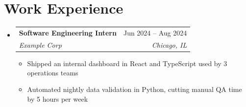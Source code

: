\documentclass[letterpaper,11pt]{article}
\makeatletter
\newcommand{\resumeItem}[1]{
  \item\small{
    {#1 \vspace{-2pt}}
  }
}
\newcommand{\resumeSubheading}[4]{
  \vspace{-2pt}\item
    \begin{tabular*}{0.97\textwidth}[t]{l@{\extracolsep{\fill}}r}
      \textbf{#1} & #2 \\
      \textit{\small#3} & \textit{\small #4} \\
    \end{tabular*}\vspace{-7pt}
}
\newcommand{\resumeSubHeadingListStart}{\begin{itemize}[leftmargin=0.15in, label={}]}
\newcommand{\resumeSubHeadingListEnd}{\end{itemize}}
\newcommand{\resumeItemListStart}{\begin{itemize}}
\newcommand{\resumeItemListEnd}{\end{itemize}\vspace{-5pt}}
\makeatother
\begin{document}
\section{Work Experience}
  \resumeSubHeadingListStart
    \resumeSubheading
      {Software Engineering Intern}{Jun 2024 -- Aug 2024}
      {Example Corp}{Chicago, IL}
      \resumeItemListStart
        \resumeItem{Shipped an internal dashboard in React and TypeScript used by 3 operations teams}
        \resumeItem{Automated nightly data validation in Python, cutting manual QA time by 5 hours per week}
      \resumeItemListEnd
  \resumeSubHeadingListEnd
\end{document}
